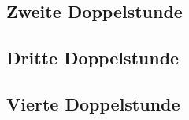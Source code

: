 \subsection{Zweite Doppelstunde}
\label{subsec:doppelstunde-2}

\subsection{Dritte Doppelstunde}
\label{subsec:doppelstunde-3}

\subsection{Vierte Doppelstunde}
\label{subsec:doppelstunde-4}